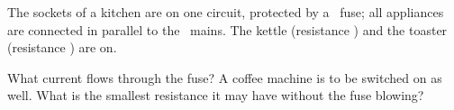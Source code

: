 The sockets of a kitchen are on one circuit, protected by a \ImaxO\ fuse; all appliances are connected in parallel to the \VO\ mains. The kettle (resistance \RkO) and the toaster (resistance \RtO) are on.

\begin{abcliste}
\abc What current flows through the fuse?
\abc A coffee machine is to be switched on as well. What is the smallest resistance it may have without the fuse blowing?
\end{abcliste}
